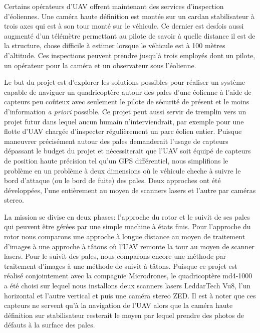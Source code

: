 Certains opérateurs d'UAV offrent maintenant des services d'inspection d'éoliennes. Une caméra haute définition est montée sur un cardan stabilisateur à trois axes qui est à son tour monté sur le véhicule. Ce dernier est desfois aussi augmenté d'un télémètre permettant au pilote de savoir à quelle distance il est de la structure, chose difficile à estimer lorsque le véhicule est à 100 mètres d'altitude. Ces inspections peuvent prendre jusqu'à trois employés dont un pilote, un opérateur pour la caméra et un observateur sous l'éolienne.

Le but du projet est d'explorer les solutions possibles pour réaliser un système capable de naviguer un quadricoptère autour des pales d'une éolienne à l'aide de capteurs peu coûteux avec seulement le pilote de sécurité de présent et le moins d'information \textit{a priori} possible. Ce projet peut aussi servir de tremplin vers un projet futur dans lequel aucun humain n'interviendrait, par exemple pour une flotte d'UAV chargée d'inspecter régulièrement un parc éolien entier. Puisque maneuvrer précisément autour des pales demanderait l'usage de capteurs dépassant le budget du projet et nécessiterait que l'UAV soit équipé de capteurs de position haute précision tel qu'un GPS différentiel, nous simplifions le problème en un problème à deux dimensions où le véhicule cheche à suivre le bord d'attaque (ou le bord de fuite) des pales. Deux approches ont été développées, l'une entièrement au moyen de scanners lasers et l'autre par caméras stereo.

La mission se divise en deux phases: l'approche du rotor et le suivit de ses pales qui peuvent être gérées par une simple machine à états finis. Pour l'approche du rotor nous comparons une approche à longue distance au moyen de traitement d'images à une approche à tâtons où l'UAV remonte la tour au moyen de scanner lasers. Pour le suivit des pales, nous comparons encore une méthode par traitement d'images à une méthode de suivit à tâtons. Puisque ce projet est réalisé conjointement avec la compagnie Microdrones, le quadricoptère md4-1000 a été choisi sur lequel nous installons deux scanners lasers LeddarTech Vu8, l'un horizontal et l'autre vertical et puis une caméra stereo ZED. Il est à noter que ces capteurs ne servent qu'à la navigation de l'UAV alors que la caméra haute définition sur stabilisateur resterait le moyen par lequel prendre des photos de défauts à la surface des pales.


